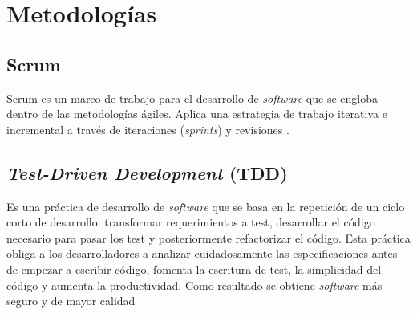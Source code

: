 
\section{Metodologías}\label{metodologias}

\subsection{Scrum}\label{scrum}

Scrum es un marco de trabajo para el desarrollo de \emph{software} que se
engloba dentro de las metodologías ágiles. Aplica una estrategia de
trabajo iterativa e incremental a través de iteraciones (\emph{sprints})
y revisiones \citep{wiki:scrum}.

\subsection{\emph{Test-Driven Development} (TDD)}\label{test-driven-development-tdd}

Es una práctica de desarrollo de \emph{software} que se basa en la repetición
de un ciclo corto de desarrollo: transformar requerimientos a test,
desarrollar el código necesario para pasar los test y posteriormente
refactorizar el código. Esta práctica obliga a los desarrolladores a
analizar cuidadosamente las especificaciones antes de empezar a escribir
código, fomenta la escritura de test, la simplicidad del código y
aumenta la productividad. Como resultado se obtiene \emph{software} más seguro
y de mayor calidad \citep{wiki:tdd}